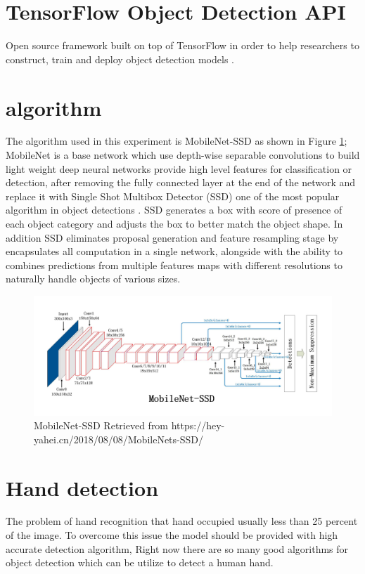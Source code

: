 \documentclass[12pt]{report}
\begin{document}
\section{TensorFlow Object Detection API}
Open source framework built on top of TensorFlow in order to help 
researchers to construct, train and deploy object detection models \cite{tf_od_api}. 

\section{algorithm}
The algorithm used in this experiment is MobileNet-SSD as shown 
in Figure \ref{fig:mobilenetssd}; MobileNet is a base network which use depth-wise 
separable convolutions to build light weight deep neural networks 
provide high level features for classification or detection, 
after removing the fully connected layer at the end of the network 
and replace it with Single Shot Multibox Detector (SSD) one of 
the most popular algorithm in object detections \cite{Liu2016}. 
SSD generates a box with score of presence of each object category 
and adjusts the box to better match the object shape. In addition SSD 
eliminates proposal generation and feature resampling stage by 
encapsulates all computation in a single network, alongside with 
the ability to combines predictions from multiple features maps 
with different resolutions to naturally handle objects of various sizes.

\begin{figure} [h]
    \centering
    \includegraphics[width=\textwidth]{./images/mobilenetssdh.png}
    \caption{MobileNet-SSD  Retrieved from https://hey-yahei.cn/2018/08/08/MobileNets-SSD/}
    \label{fig:mobilenetssd}
\end{figure}


\section{Hand detection}
The problem of hand recognition that hand occupied usually less than 25 percent of the image.
To overcome this issue the model should be provided with high accurate detection algorithm,
Right now there are so many good algorithms for object detection which can be utilize to 
detect a human hand.
\end{document}
